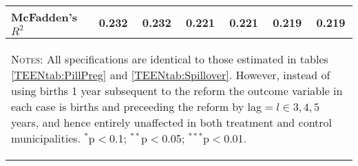 \begin{landscape}
\begin{table}[!htbp]
\begin{tabular}{lcccccc}
McFadden's $R^2$&0.232&0.232&0.221&0.221&0.219&0.219\\  \hline \hline
\multicolumn{7}{p{17.2cm}}{\begin{footnotesize}\textsc{Notes:}
All specifications are identical to those estimated in tables 
\ref{TEENtab:PillPreg} and \ref{TEENtab:Spillover}.  However, 
instead of using births 1 year subsequent to the reform 
the outcome variable in each case is births and preceeding 
the reform by lag$=l\in{3,4,5}$ years, and hence entirely
unaffected in both treatment and control municipalities.
$^{*}$p$<$0.1; $^{**}$p$<$0.05; $^{***}$p$<$0.01.\end{footnotesize}}
\normalsize\end{tabular}\end{table}\end{landscape}
